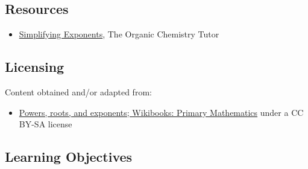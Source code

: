 \subsection{Resources}
\label{sss:reso-55b5}




\begin{itemize}
    \item \href{https://www.youtube.com/watch?v=Zt2fdy3zrZU}{Simplifying Exponents}, The Organic Chemistry Tutor
\end{itemize}


\subsection{Licensing}
\label{sss:lice-73522}




Content obtained and/or adapted from:



\begin{itemize}
    \item \href{https://en.wikibooks.org/wiki/Primary_Mathematics/Powers,_roots,_and_exponents}{Powers, roots, and exponents; Wikibooks: Primary Mathematics} under a CC BY-SA license
\end{itemize}


\subsection{Learning Objectives}
\label{ssec:lear-fe6e}



